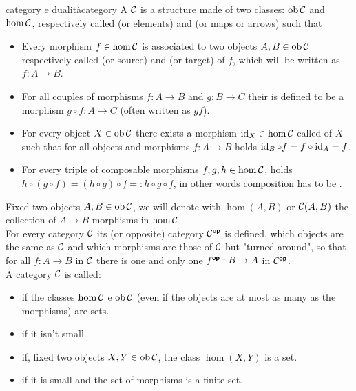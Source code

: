 \documentclass{article}
\renewcommand\C{\mc{C}}
\begin{document}
\begin{definition}{category e dualità}{category}
    A  $\C$ is a structure made of two classes: $\ob\C$ and $\hom\C$, respectively called  (or elements) and  (or maps or arrows) such that \begin{itemize}
        \item Every morphism $f \in \hom\C$ is associated to two objects $A,B \in \ob\C$ respectively called  (or source) and  (or target) of $f$, which will be written as $f : A\to B$.
        \item For all couples of morphisms $f:A\to B$ and $g : B\to C$ their  is defined to be a morphism $g\circ f : A \to C$ (often written as $gf$).
        \item For every object $X \in \ob\C$ there exists a morphism $\id_X \in \hom\C$ called  of $X$ such that for all objects and morphisms $f:A\to B$ holds $\operatorname{id}_B \circ f = f\circ \operatorname{id}_A = f$.
        \item For every triple of composable morphisms $f,g,h \in \hom\C$, holds $h\circ(g\circ f) = (h\circ g)\circ f =: h\circ g\circ f$, in other words composition has to be .
    \end{itemize}
    Fixed two objects $A,B \in \ob\C$, we will denote with $\hom(A,B)$ or $\C(A,B)$ the collection of $A\to B$ morphisms in $\hom\C$.\\
    For every category $\C$ its  (or opposite) category $\C^\op$ is defined, which objects are the same as $\C$ and which morphisms are those of $\C$ but "turned around", so that for all $f:A\to B$ in $\C$ there is one and only one $f^{\text{\sffamily\textbf{op}}} : B\to A$ in $\C^\op$.\\
    A category $\C$ is called:\begin{itemize}
        \item {} if the classes $\hom\C$ e $\ob\C$ (even if the objects are at most as many as the morphisms) are sets.
        \item {} if it isn't small.
        \item {} if, fixed two objects $X,Y \in \ob\C$, the class $\hom(X,Y)$ is a set.
        \item {} if it is small and the set of morphisms is a finite set.
    \end{itemize}
\end{definition}
\end{document}
